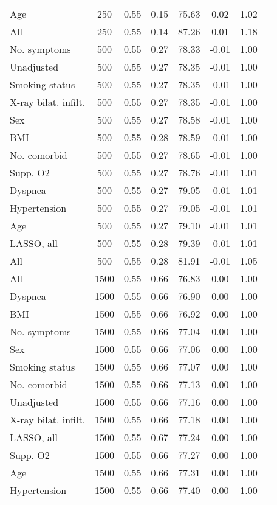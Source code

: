 \documentclass{article}
\begin{document}
{\begin{longtable}{lccccccc}
Age & 250 & 0.55 & 0.15 &  75.63 &  0.02 & 1.02 \\ 
All & 250 & 0.55 & 0.14 &  87.26 &  0.01 & 1.18 \\ \midrule 
No. symptoms & 500 & 0.55 & 0.27 &  78.33 & -0.01 & 1.00 \\ 
Unadjusted & 500 & 0.55 & 0.27 &  78.35 & -0.01 & 1.00 \\ 
Smoking status & 500 & 0.55 & 0.27 &  78.35 & -0.01 & 1.00 \\ 
X-ray bilat. infilt. & 500 & 0.55 & 0.27 &  78.35 & -0.01 & 1.00 \\ 
Sex & 500 & 0.55 & 0.27 &  78.58 & -0.01 & 1.00 \\ 
BMI & 500 & 0.55 & 0.28 &  78.59 & -0.01 & 1.00 \\ 
No. comorbid & 500 & 0.55 & 0.27 &  78.65 & -0.01 & 1.00 \\ 
Supp. O2 & 500 & 0.55 & 0.27 &  78.76 & -0.01 & 1.01 \\ 
Dyspnea & 500 & 0.55 & 0.27 &  79.05 & -0.01 & 1.01 \\ 
Hypertension & 500 & 0.55 & 0.27 &  79.05 & -0.01 & 1.01 \\ 
Age & 500 & 0.55 & 0.27 &  79.10 & -0.01 & 1.01 \\ 
LASSO, all & 500 & 0.55 & 0.28 &  79.39 & -0.01 & 1.01 \\ 
All & 500 & 0.55 & 0.28 &  81.91 & -0.01 & 1.05 \\ \midrule 
All & 1500 & 0.55 & 0.66 &  76.83 &  0.00 & 1.00 \\ 
Dyspnea & 1500 & 0.55 & 0.66 &  76.90 &  0.00 & 1.00 \\ 
BMI & 1500 & 0.55 & 0.66 &  76.92 &  0.00 & 1.00 \\ 
No. symptoms & 1500 & 0.55 & 0.66 &  77.04 &  0.00 & 1.00 \\ 
Sex & 1500 & 0.55 & 0.66 &  77.06 &  0.00 & 1.00 \\ 
Smoking status & 1500 & 0.55 & 0.66 &  77.07 &  0.00 & 1.00 \\ 
No. comorbid & 1500 & 0.55 & 0.66 &  77.13 &  0.00 & 1.00 \\ 
Unadjusted & 1500 & 0.55 & 0.66 &  77.16 &  0.00 & 1.00 \\ 
X-ray bilat. infilt. & 1500 & 0.55 & 0.66 &  77.18 &  0.00 & 1.00 \\ 
LASSO, all & 1500 & 0.55 & 0.67 &  77.24 &  0.00 & 1.00 \\ 
Supp. O2 & 1500 & 0.55 & 0.66 &  77.27 &  0.00 & 1.00 \\ 
Age & 1500 & 0.55 & 0.66 &  77.31 &  0.00 & 1.00 \\ 
Hypertension & 1500 & 0.55 & 0.66 &  77.40 &  0.00 & 1.00 \\
\bottomrule
\hline
\end{longtable}
}
\end{document}
